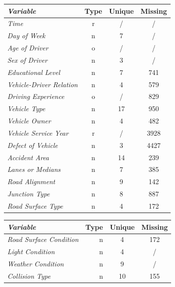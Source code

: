 \documentclass{article}
\begin{document}
\begin{table}[H]
    \parbox{.5\linewidth}{
        \begin{tabular}{l@{}c@{}c@{}c}
            \textit{\textbf{Variable}} & \textbf{Type} \hspace{0.3em} & \textbf{Unique} \hspace{0.3em} & \textbf{Missing}\\\hline
            \textit{Time} & r & / & / \\
            \textit{Day of Week} & n & 7 & /\\
            \textit{Age of Driver} & o & / & /\\
            \textit{Sex of Driver} & n & 3 &/ \\
            \textit{Educational Level} & n & 7 & 741\\
            \textit{Vehicle-Driver Relation} & n & 4 & 579 \\
            \textit{Driving Experience} & o & / & 829\\
            \textit{Vehicle Type} & n & 17 & 950\\
            \textit{Vehicle Owner} & n & 4 & 482\\
            \textit{Vehicle Service Year} & r & / & 3928\\
            \textit{Defect of Vehicle} & n & 3 & 4427\\
            \textit{Accident Area} & n & 14 & 239\\
            \textit{Lanes or Medians} & n & 7 & 385\\
            \textit{Road Alignment} & n & 9 & 142\\
            \textit{Junction Type} & n & 8 & 887\\
            \textit{Road Surface Type} & n  & 4 & 172
        \end{tabular}
    }
    \hfill
    \parbox{.5\linewidth}{
        \begin{tabular}{l@{}r@{}c@{}c}
            \textit{\textbf{Variable}} & \textbf{Type} \hspace{0.3em} & \textbf{Unique} \hspace{0.3em} & \textbf{Missing}\\\hline
            \textit{Road Surface Condition} & n & 4 & 172\\
            \textit{Light Condition} & n & 4 & /\\
            \textit{Weather Condition} & n & 9 &/\\
            \textit{Collision Type} & n & 10  & 155\\

\end{tabular}}
\end{table}
\end{document}
